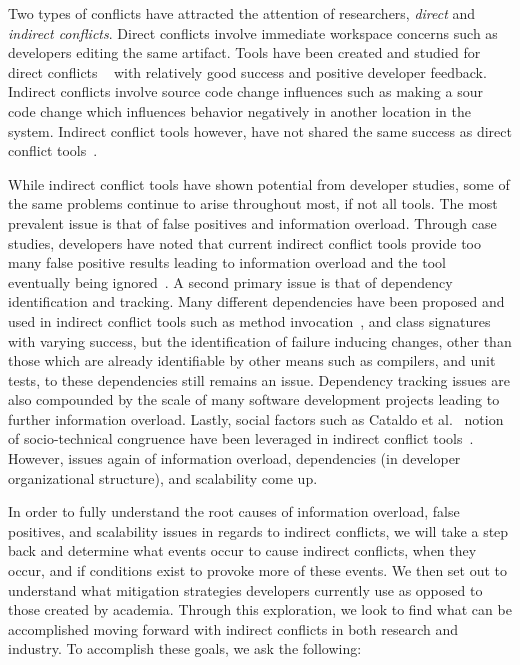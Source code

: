 \documentclass[conference]{IEEEtran}
\begin{document}
Two types of conflicts have attracted the attention of researchers, \textit{direct} and 
\textit{indirect conflicts}. Direct conflicts involve immediate workspace concerns such as developers editing the same
artifact. Tools have been created and studied for direct conflicts
~\cite{Xiang:2008:ERT, Biehl:2007:FVD, Sarma:2009:TIV, Khurana:2009:PFC} with relatively good success and 
positive developer feedback. Indirect conflicts involve source code change influences such as making a sour code change 
which influences behavior negatively in another location in the system. Indirect conflict tools however, have
not shared the same success as direct conflict 
tools~\cite{Sarma:2007:TSA, Holmes:2010:CAR, Trainer:2005:BGT, Servant:2010:CPI, Borici:2012:CHA}.

While indirect conflict tools have shown potential from developer studies, some of the same problems continue
to arise throughout most, if not all tools. The most prevalent issue is that of false positives and information
overload. Through case studies, developers have noted that current indirect conflict tools provide too many 
false positive results leading to information overload and the tool eventually being
ignored~\cite{Sarma:2007:TSA, Servant:2010:CPI}. A second primary issue is that of dependency identification and
tracking. Many different dependencies have been proposed and used in indirect conflict tools such as method 
invocation~\cite{Trainer:2005:BGT}, and class signatures~\cite{Sarma:2007:TSA} with varying success, but the 
identification of failure inducing changes, other than those which are already identifiable by other means such
as compilers, and unit tests, to these dependencies still remains an issue. Dependency tracking issues are
also compounded by the scale of many software development projects leading to further information overload.
Lastly, social factors such as Cataldo et al.~\cite{Cataldo:2006:ICR} notion of socio-technical
congruence have been leveraged in indirect conflict tools~\cite{Kwan:2011:ESC, Begel:2010:CDE, Borici:2012:CHA}.
However, issues again of information overload, dependencies (in developer organizational structure), and scalability 
come up.

In order to fully understand the root causes of information overload, false positives, and
scalability issues in regards to indirect conflicts, we will take a step back and determine what events occur to
cause indirect conflicts, when they occur, and if conditions exist to provoke more of these events. 
We then set out to understand what mitigation strategies developers currently use as opposed to those created
by academia. Through this exploration, we look to find what can be accomplished moving forward with indirect conflicts
in both research and industry. To accomplish these goals, we ask the following: 
\end{document}
